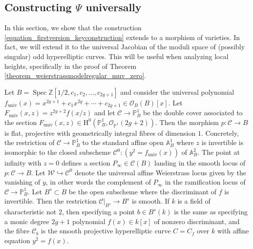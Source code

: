 \documentclass{article} %
\numberwithin{equation}{section}
\DeclareMathOperator{\Spec}{Spec}
\newcommand{\A}{\mathbb{A}}
\renewcommand{\P}{\mathbb{P}}
\renewcommand{\O}{\mathcal{O}}
\newcommand{\HH}{\mathrm{H}}
\newcommand{\Z}{\mathbb{Z}}
\begin{document}
\subsection{Constructing $\Psi$ universally}


In this section, we show that the construction \eqref{equation_firstversion_keyconstruction} extends to a morphism of varieties.
In fact, we will extend it to the universal Jacobian of the moduli space of (possibly singular) odd hyperelliptic curves.
This will be useful when analyzing local heights, specifically in the proof of Theorem \ref{theorem_weierstrassmodelregular_muv_zero}.

Let $B = \Spec \Z[1/2, c_1, c_2, \dots, c_{2g+1}]$ and consider the universal polynomial $f_{\mathrm{univ}}(x) = x^{2g+1} +c_1x^{2g} + \cdots + c_{2g+1} \in \O_B(B)[x]$.
Let $F_{\mathrm{univ}}(x,z) = z^{2g+2}f(x/z)$ and let $\mathcal{C}\rightarrow \P^1_B$ be the double cover associated to the section $F_{\mathrm{univ}}(x,z) \in \HH^0(\P^1_B, \O_{ \P^1 }(2g+2))$. 
Then the morphism $p \colon \mathcal{C} \rightarrow B$ is flat, projective with geometrically integral fibres of dimension $1$.
Concretely, the restriction of $\mathcal{C}\rightarrow \P^1_B$ to the standard affine open $\A^1_B$ where $z$ is invertible is isomorphic to the closed subscheme $\mathcal{C}^{0}\colon (y^2 = f_{\mathrm{univ}}(x))$ of $\A^2_B$.
The point at infinity with $z=0$ defines a section $P_\infty \in \mathcal{C}(B)$ landing in the smooth locus of $p\colon \mathcal{C}\rightarrow B$.
Let $\mathcal{W}\hookrightarrow \mathcal{C}^{0}$ denote the universal affine Weierstrass locus given by the vanishing of $y$, in other words the complement of $P_{\infty}$ in the ramification locus of $\mathcal{C}\rightarrow \P^1_B$.
Let $B^s\subset B$ be the open subscheme where the discriminant of $f$ is invertible.
Then the restriction $\mathcal{C}|_{B^s}\rightarrow B^s$ is smooth.
If $k$ is a field of characteristic not 2, then specifying a point $b\in B^s(k)$ is the same as specifying a monic degree $2g+1$ polynomial $f(x)\in k[x]$ of nonzero discriminant, and the fibre $\mathcal{C}_b$ is the smooth projective hyperelliptic curve $C = C_f$ over $k$ with affine equation $y^2 = f(x)$.
\end{document}
